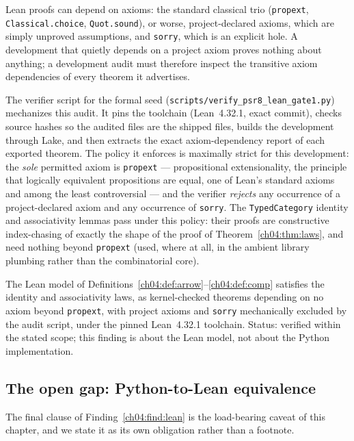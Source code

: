 Lean proofs can depend on axioms: the standard classical trio
(\texttt{propext}, \texttt{Classical.choice}, \texttt{Quot.sound}), or worse,
project-declared axioms, which are simply unproved assumptions, and
\texttt{sorry}, which is an explicit hole. A development that quietly
depends on a project axiom proves nothing about anything; a development
audit must therefore inspect the transitive axiom dependencies of every
theorem it advertises.

The verifier script for the formal seed
(\texttt{scripts/verify\_psr8\_lean\_gate1.py}) mechanizes this audit. It
pins the toolchain (Lean~4.32.1, exact commit), checks source hashes so the
audited files are the shipped files, builds the development through Lake,
and then extracts the exact axiom-dependency report of each exported
theorem. The policy it enforces is maximally strict for this development:
the \emph{sole} permitted axiom is \texttt{propext} --- propositional
extensionality, the principle that logically equivalent propositions are
equal, one of Lean's standard axioms and among the least controversial ---
and the verifier \emph{rejects} any occurrence of a project-declared axiom
and any occurrence of \texttt{sorry}. The \texttt{TypedCategory} identity
and associativity lemmas pass under this policy: their proofs are
constructive index-chasing of exactly the shape of the proof of
Theorem~\ref{ch04:thm:laws}, and need nothing beyond \texttt{propext} (used,
where at all, in the ambient library plumbing rather than the combinatorial
core).

\begin{finding}
\label{ch04:find:lean}
The Lean model of Definitions~\ref{ch04:def:arrow}--\ref{ch04:def:comp}
satisfies the identity and associativity laws, as kernel-checked theorems
depending on no axiom beyond \texttt{propext}, with project axioms and
\texttt{sorry} mechanically excluded by the audit script, under the pinned
Lean~4.32.1 toolchain. \textup{Status: verified within the stated scope;
this finding is about the Lean model, not about the Python implementation.}
\end{finding}

\subsection{The open gap: Python-to-Lean equivalence}
\label{ch04:sec:gap}

The final clause of Finding~\ref{ch04:find:lean} is the load-bearing caveat
of this chapter, and we state it as its own obligation rather than a
footnote.

